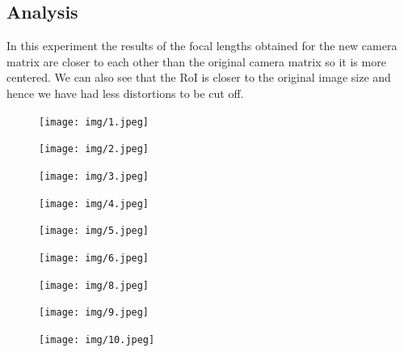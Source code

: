 \documentclass{scrartcl}
\begin{document}
 



\subsection{Analysis}

In this experiment the results of the focal lengths obtained for the new camera matrix are  closer to each other than the original camera matrix so it is more centered. We can also see that the RoI is closer to the original image size and hence we have had less distortions to be cut off.\\


\begin{figure}[H]
\centering
\begin{minipage}{.5\textwidth}
  \centering
  \texttt{[image: img/1.jpeg]}
\end{minipage}
\begin{minipage}{.5\textwidth}
  \centering
  \texttt{[image: img/2.jpeg]}
\end{minipage}
\begin{minipage}{.5\textwidth}
  \centering
  \texttt{[image: img/3.jpeg]}
\end{minipage}
\begin{minipage}{.5\textwidth}
  \centering
  \texttt{[image: img/4.jpeg]}
\end{minipage}
\begin{minipage}{.5\textwidth}
  \centering
  \texttt{[image: img/5.jpeg]}
\end{minipage}
\begin{minipage}{.5\textwidth}
  \centering
  \texttt{[image: img/6.jpeg]}
\end{minipage}
\begin{minipage}{.5\textwidth}
  \centering
  \texttt{[image: img/8.jpeg]}
\end{minipage}
\begin{minipage}{.5\textwidth}
  \centering
  \texttt{[image: img/9.jpeg]}
\end{minipage}
\begin{minipage}{.5\textwidth}
  \centering
  \texttt{[image: img/10.jpeg]}
\end{minipage}

\end{figure}
\end{document}
